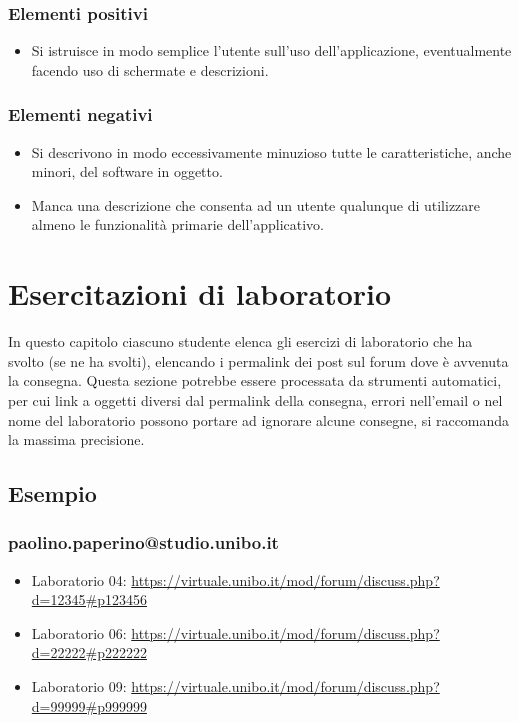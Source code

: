 \documentclass[a4paper,12pt]{report}
\begin{document}
\subsection*{Elementi positivi}

\begin{itemize}
 \item Si istruisce in modo semplice l'utente sull'uso dell'applicazione, eventualmente facendo uso di schermate e descrizioni.
\end{itemize}

\subsection*{Elementi negativi}
\begin{itemize}
 \item Si descrivono in modo eccessivamente minuzioso tutte le caratteristiche, anche minori, del software in oggetto.
 \item Manca una descrizione che consenta ad un utente qualunque di utilizzare almeno le funzionalità primarie dell'applicativo.
\end{itemize}

\chapter{Esercitazioni di laboratorio}

In questo capitolo ciascuno studente elenca gli esercizi di laboratorio che ha svolto
(se ne ha svolti),
elencando i permalink dei post sul forum dove è avvenuta la consegna.
%
Questa sezione potrebbe essere processata da strumenti automatici,
per cui link a oggetti diversi dal permalink della consegna,
errori nell'email o nel nome del laboratorio possono portare ad ignorare alcune consegne,
si raccomanda la massima precisione.

\section*{Esempio}

\subsection{paolino.paperino@studio.unibo.it}

\begin{itemize}
 \item Laboratorio 04: \url{https://virtuale.unibo.it/mod/forum/discuss.php?d=12345#p123456}
 \item Laboratorio 06: \url{https://virtuale.unibo.it/mod/forum/discuss.php?d=22222#p222222}
 \item Laboratorio 09: \url{https://virtuale.unibo.it/mod/forum/discuss.php?d=99999#p999999}
\end{itemize}
\end{document}
